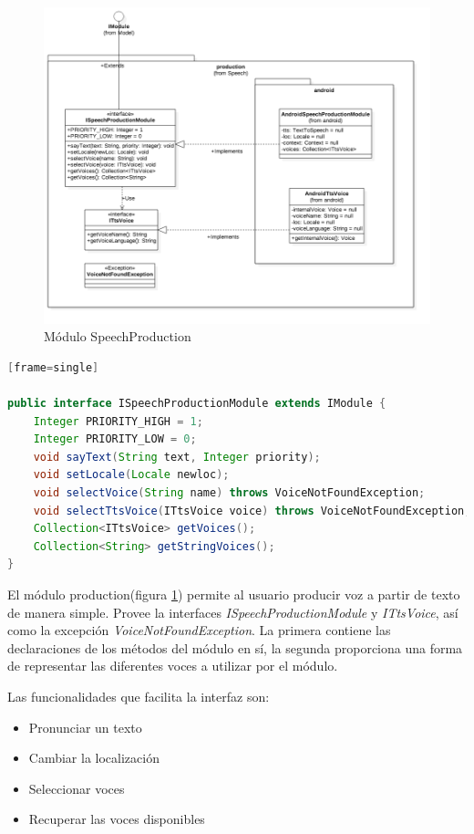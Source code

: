 \begin{figure}
	\centering
	\includegraphics[width=1\linewidth]{imagenes/diagramas/SpeechProductionModule.png}
	\caption{Módulo SpeechProduction}
	\label{fig:speech-production-module}
\end{figure}

\begin{lstlisting}[language=Java][frame=single]

public interface ISpeechProductionModule extends IModule {
    Integer PRIORITY_HIGH = 1;
    Integer PRIORITY_LOW = 0;
    void sayText(String text, Integer priority);
    void setLocale(Locale newloc);
    void selectVoice(String name) throws VoiceNotFoundException;
    void selectTtsVoice(ITtsVoice voice) throws VoiceNotFoundException;
    Collection<ITtsVoice> getVoices();
    Collection<String> getStringVoices();
}

\end{lstlisting}


El módulo production(figura \ref{fig:speech-production-module}) permite al usuario producir voz a partir de texto de manera simple.
Provee la interfaces \textit{ISpeechProductionModule} y \textit{ITtsVoice}, así como la excepción \textit{VoiceNotFoundException}.
La primera contiene las declaraciones de los métodos del módulo en sí, la segunda proporciona una forma de representar las diferentes voces a utilizar por el módulo.

Las funcionalidades que facilita la interfaz son:

\begin{itemize}
	\item Pronunciar un texto
	\item Cambiar la localización 
	\item Seleccionar voces
	\item Recuperar las voces disponibles
\end{itemize}

